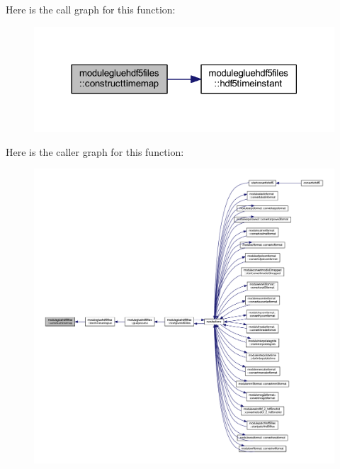 Here is the call graph for this function\+:\nopagebreak
\begin{figure}[H]
\begin{center}
\leavevmode
\includegraphics[width=318pt]{namespacemodulegluehdf5files_a30ae163f5236c7c84af5e6fd552d3da1_cgraph}
\end{center}
\end{figure}
Here is the caller graph for this function\+:\nopagebreak
\begin{figure}[H]
\begin{center}
\leavevmode
\includegraphics[width=350pt]{namespacemodulegluehdf5files_a30ae163f5236c7c84af5e6fd552d3da1_icgraph}
\end{center}
\end{figure}
\mbox{\label{namespacemodulegluehdf5files_a102906b766caaf9abc74b0c0de97ab0c}} 
